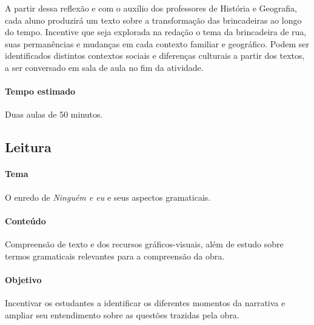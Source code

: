 \documentclass[11pt]{extarticle}
\begin{document}

A partir dessa reflexão e com o auxílio dos professores de História e Geografia, cada aluno produzirá um texto sobre a transformação das brincadeiras ao longo do tempo. Incentive que seja explorada na redação o tema da brincadeira de rua, suas permanências e mudanças em cada contexto familiar e geográfico. Podem ser identificados distintos contextos sociais e diferenças culturais a partir dos textos, a ser conversado em sala de aula no fim da atividade.

\paragraph{Tempo estimado} Duas aulas de 50 minutos.

\subsection{Leitura}


\paragraph{Tema} O enredo de \textit{Ninguém e eu} e seus aspectos gramaticais.

\paragraph{Conteúdo} Compreensão de texto e dos recursos gráficos-visuais, além de estudo sobre termos gramaticais relevantes para a compreensão da obra.

\paragraph{Objetivo} Incentivar os estudantes a identificar os diferentes momentos da narrativa e ampliar seu entendimento sobre as questões trazidas pela obra.
\end{document}
